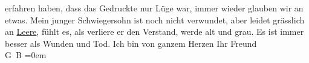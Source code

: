 \begin{ledgroupsized}[t]{13cm}
               erfahren haben, dass das Gedruckte {\pb}nur Lüge war, immer wieder glauben wir an etwas.\pend
           \pstart
           Mein junger Schwiegersohn ist
               noch nicht verwundet, aber leidet grässlich an \uline{Leere},
               fühlt es, als verliere er den Verstand, werde alt und grau. Es ist immer besser als
               Wunden und Tod.\pend
           \pstart
           Ich bin von ganzem Herzen Ihr Freund{\\[\baselineskip]}\spacefill\mbox{G B}\pend
           \leftskip=0em{}\endnumbering{}\end{ledgroupsized}  \newcommand{\dateiname}{L02223}\newcommand{\titel}{Georg Brandes an Arthur Schnitzler, 13. 12. 1915}\newcommand{\editorInnen}{Martin Anton Müller und Gerd-Hermann Susen}
            \footnotesize
\begin{ledgroupsized}[t]{11.5cm}
\end{ledgroupsized}
         
      
